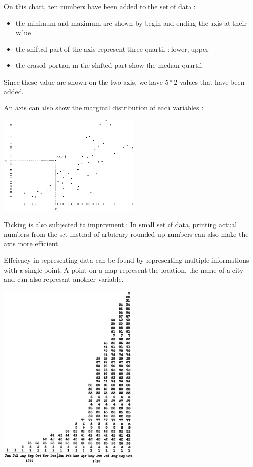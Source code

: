 On this chart, ten numbers have been added to the set of data : 
\begin{itemize}
\item the minimum and maximum are shown by begin and ending the axis at their value
\item the shifted part of the axis represent three quartil : lower, upper
\item the erased portion in the shifted part show the median quartil
\end{itemize}
Since these value are shown on the two axis, we have $5*2$ values that have been added.

An axis can also show the marginal distribution of each variables :

\centerline{
\includegraphics[width=07cm]{./illustrations/annexes/axesdistributions.eps}
}

Ticking is also subjected to improvment : In small set of data, printing actual numbers from the set instead of arbitrary rounded up numbers can also make the axis more efficient.

Effciency in representing data can be found by representing multiple informations with a single point. A point on a map represent the location, the name of a city and can also represent another variable.

\centerline{
\includegraphics[width=07cm]{./illustrations/annexes/temps_wwi.eps}
}

